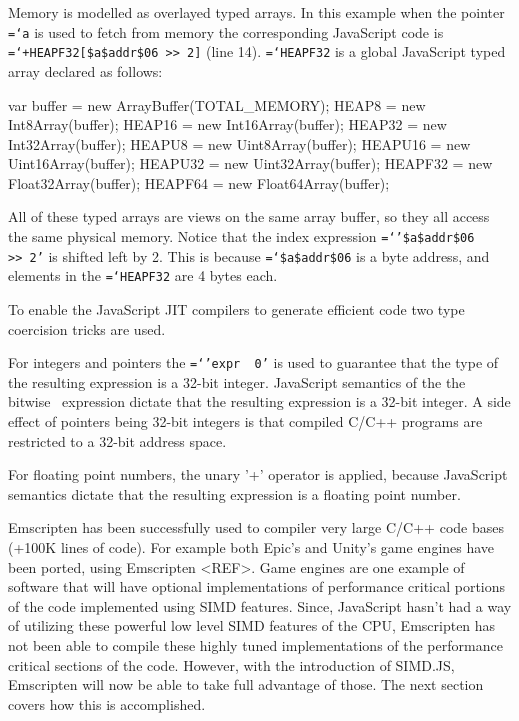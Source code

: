 \documentclass[preprint]{sigplanconf}
\newcommand{\ttt}[1]{{\texttt{\hyphenchar\font=`\-\relax #1}}}%
\begin{document}
Memory is modelled as overlayed typed arrays.
In this example when the pointer \ttt{*a} is used to fetch from memory the corresponding
JavaScript code is \ttt{+HEAPF32[\$a\$addr\$06 \textgreater\textgreater \ 2]} (line 14).
\ttt{HEAPF32} is a global JavaScript typed array declared as follows:

\smallskip
\begin{program}[style=tt]
var buffer = new ArrayBuffer(TOTAL\_MEMORY);\newline
HEAP8 = new Int8Array(buffer);\newline
HEAP16 = new Int16Array(buffer);\newline
HEAP32 = new Int32Array(buffer);\newline
HEAPU8 = new Uint8Array(buffer);\newline
HEAPU16 = new Uint16Array(buffer);\newline
HEAPU32 = new Uint32Array(buffer);\newline
HEAPF32 = new Float32Array(buffer);\newline
HEAPF64 = new Float64Array(buffer);\newline
\end{program}
\smallskip

All of these typed arrays are views on the same array buffer, so they all
access the same physical memory.  Notice that the index expression
\ttt{'\$a\$addr\$06 \textgreater\textgreater\ 2'} is shifted left by 2.
This is because \ttt{\$a\$addr\$06} is a byte address, and elements in the
\ttt{HEAPF32} are 4 bytes each.

To enable the JavaScript JIT compilers to generate efficient code two
type coercision tricks are used.

For integers and pointers the \ttt{'expr \textbar\ 0'} is used to guarantee
that the type of the resulting expression is a 32-bit integer.  JavaScript
semantics of the the bitwise \textbar\ expression dictate that the resulting
expression is a 32-bit integer.  A side effect of pointers being 32-bit integers
is that compiled C/C++ programs are restricted to a 32-bit address space.

For floating point numbers, the unary '+' operator is applied, because JavaScript
semantics dictate that the resulting expression is a floating point number.

Emscripten has been successfully used to compiler very large C/C++ code
bases (+100K lines of code).  For example both Epic's and Unity's game engines
have been ported, using Emscripten <REF>.  Game engines are one example of
software that will have optional implementations of performance critical
portions of the code implemented using SIMD features.  Since, JavaScript
hasn't had a way of utilizing these powerful low level SIMD features of the
CPU, Emscripten has not been able to compile these highly tuned implementations
of the performance critical sections of the code. However, with the introduction
of SIMD.JS, Emscripten will now be able to take full advantage of those.  The next
section covers how this is accomplished.
\end{document}
